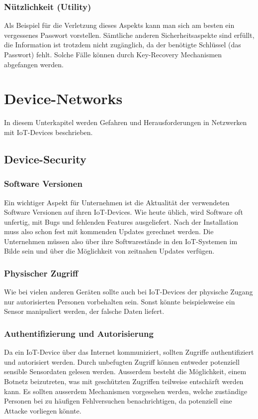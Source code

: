 \subsubsection{Nützlichkeit (Utility)}
Als Beispiel für die Verletzung dieses Aspekts kann man sich am besten ein vergessenes Passwort vorstellen. Sämtliche anderen Sicherheitsaspekte sind erfüllt, die Information ist trotzdem nicht zugänglich, da der benötigte Schlüssel (das Passwort) fehlt. Solche Fälle können durch Key-Recovery Mechanismen abgefangen werden. \cite{ParkerianHexadWiki}
\section{Device-Networks}
In diesem Unterkapitel werden Gefahren und Herausforderungen in Netzwerken mit IoT-Devices beschrieben.
\subsection{Device-Security}
\subsubsection{Software Versionen}
Ein wichtiger Aspekt für Unternehmen ist die Aktualität der verwendeten Software Versionen auf ihren IoT-Devices. Wie heute üblich, wird Software oft unfertig, mit Bugs und fehlenden Features ausgeliefert. Nach der Installation muss also schon fest mit kommenden Updates gerechnet werden. Die Unternehmen müssen also über ihre Softwarestände in den IoT-Systemen im Bilde sein und über die Möglichkeit von zeitnahen Updates verfügen. 

\subsubsection{Physischer Zugriff}
Wie bei vielen anderen Geräten sollte auch bei IoT-Devices der physische Zugang nur autorisierten Personen vorbehalten sein. Sonst könnte beispielsweise ein Sensor manipuliert werden, der falsche Daten liefert.

\subsubsection{Authentifizierung und Autorisierung}
Da ein IoT-Device über das Internet kommuniziert, sollten Zugriffe authentifiziert und autorisiert werden. Durch unbefugten Zugriff können entweder potenziell sensible Sensordaten gelesen werden. Ausserdem besteht die Möglichkeit, einem Botnetz beizutreten, was mit geschützten Zugriffen teilweise entschärft werden kann. Es sollten ausserdem Mechanismen vorgesehen werden, welche zuständige Personen bei zu häufigen Fehlversuchen benachrichtigen, da potenziell eine Attacke vorliegen könnte.
 \newpage
